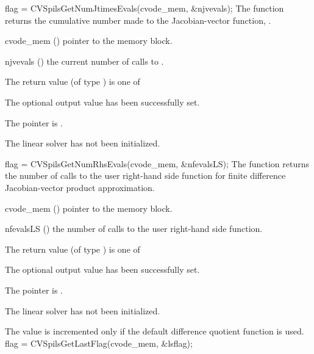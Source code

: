{}
{
  flag = CVSpilsGetNumJtimesEvals(cvode\_mem, \&njvevals);
}
{
  The function  returns the
  cumulative number made to the Jacobian-vector function,
  .
}
{
  \begin{args}
  \item[cvode\_mem] ()
    pointer to the {\cvodes} memory block.
  \item[njvevals] ()
    the current number of calls to .
  \end{args}
}
{
  The return value  (of type ) is one of
  \begin{args}
  \item[\Id{CVSPILS\_SUCCESS}] 
    The optional output value has been successfully set.
  \item[\Id{CVSPILS\_MEM\_NULL}]
    The  pointer is .
  \item[\Id{CVSPILS\_LMEM\_NULL}]
    The {\cvspils} linear solver has not been initialized.
  \end{args}
}
{}
{
  flag = CVSpilsGetNumRhsEvals(cvode\_mem, \&nfevalsLS);
}
{
  The function  returns the
  number of calls to the user right-hand side function for
  finite difference Jacobian-vector product approximation.
}
{
  \begin{args}
  \item[cvode\_mem] ()
    pointer to the {\cvodes} memory block.
  \item[nfevalsLS] ()
    the number of calls to the user right-hand side function.
  \end{args}
}
{
  The return value  (of type ) is one of
  \begin{args}
  \item[\Id{CVSPILS\_SUCCESS}] 
    The optional output value has been successfully set.
  \item[\Id{CVSPILS\_MEM\_NULL}]
    The  pointer is .
  \item[\Id{CVSPILS\_LMEM\_NULL}]
    The {\cvspils} linear solver has not been initialized.
  \end{args}
}
{
  The value  is incremented only if the default 
   difference quotient function is used.
}
{
  flag = CVSpilsGetLastFlag(cvode\_mem, \&lsflag);
}
